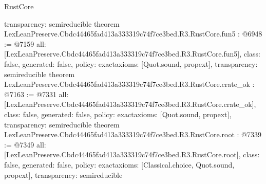 \begin{lexlean}{RustCore}
\begin{coremodule}
{  transparency: semireducible
}
theorem LexLeanPreserve.Cbdc44465fad413a333319c74f7ce3bed.R3.RustCore.fun5 : @6948 := @7159 {
  all: [LexLeanPreserve.Cbdc44465fad413a333319c74f7ce3bed.R3.RustCore.fun5],
  class: false,
  generated: false,
  policy: exact{axioms: [Quot.sound, propext]},
  transparency: semireducible
}
theorem LexLeanPreserve.Cbdc44465fad413a333319c74f7ce3bed.R3.RustCore.crate_ok : @7163 := @7331 {
  all: [LexLeanPreserve.Cbdc44465fad413a333319c74f7ce3bed.R3.RustCore.crate_ok],
  class: false,
  generated: false,
  policy: exact{axioms: [Quot.sound, propext]},
  transparency: semireducible
}
theorem LexLeanPreserve.Cbdc44465fad413a333319c74f7ce3bed.R3.RustCore.root : @7339 := @7349 {
  all: [LexLeanPreserve.Cbdc44465fad413a333319c74f7ce3bed.R3.RustCore.root],
  class: false,
  generated: false,
  policy: exact{axioms: [Classical.choice, Quot.sound, propext]},
  transparency: semireducible
}


\end{coremodule}
\end{lexlean}
